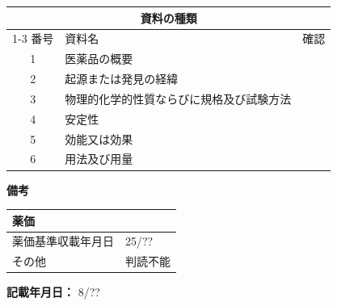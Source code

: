 \documentclass[UTF8,10pt,a4paper,fontset=fandol]{ctexart}
\newcommand{\fieldvalue}[1]{#1}
\newcommand{\handwritten}[1]{#1}
\begin{document}
\begin{tabularx}{\textwidth}{|c|X|c|}
\hline
\multicolumn{3}{|c|}{資料の種類} \\
\cline{1-3}
番号 & 資料名 & 確認 \\
\hline
1 & 医薬品の概要 & 
\fieldvalue{\handwritten{\checkmark}} \\
\hline
2 & 起源または発見の経緯 & 
\fieldvalue{\handwritten{\checkmark}} \\
\hline
3 & 物理的化学的性質ならびに規格及び試験方法 & 
\fieldvalue{\handwritten{\checkmark}} \\
\hline
4 & 安定性 & 
\fieldvalue{\handwritten{\checkmark}} \\
\hline
5 & 効能又は効果 & 
\fieldvalue{\handwritten{\checkmark}} \\
\hline
6 & 用法及び用量 & 
\fieldvalue{\handwritten{\checkmark}} \\
\hline
\end{tabularx}

\vspace{1em}

\noindent
\textbf{備考}

\begin{tabularx}{\textwidth}{|p{}|X|}
\hline
薬価 & \\
\hline
薬価基準収載年月日 &
\fieldvalue{\handwritten{25/??}} \\
\hline
その他 &
\fieldvalue{\handwritten{判読不能}} \\
\hline
\end{tabularx}

\vspace{1em}

\noindent
\textbf{記載年月日：}
\fieldvalue{\handwritten{8/??}}
\end{document}
